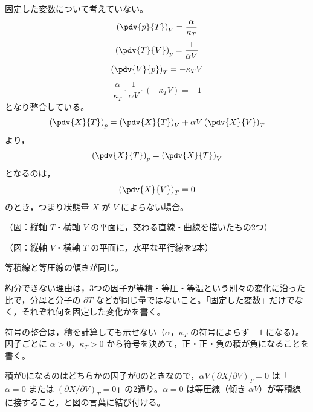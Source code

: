 固定した変数について考えていない。
\[ \left(\pdv{p}{T}\right)_{V}=\frac{\alpha}{\kappa_{T}} \]
\[ \left(\pdv{T}{V}\right)_{p}=\frac{1}{\alpha V} \]
\[ \left(\pdv{V}{p}\right)_{T}=-\kappa_{T}V \]
\[ \frac{\alpha}{\kappa_{T}}\cdot\frac{1}{\alpha V}\cdot(-\kappa_{T}V)=-1 \]
となり整合している。
\[ \left(\pdv{X}{T}\right)_{p}=\left(\pdv{X}{T}\right)_{V}+\alpha V\left(\pdv{X}{V}\right)_{T} \]
より，
\[ \left(\pdv{X}{T}\right)_{p}=\left(\pdv{X}{T}\right)_{V} \]
となるのは，
\[ \left(\pdv{X}{V}\right)_{T}=0 \]
のとき，つまり状態量 $X$ が $V$ によらない場合。

（図：縦軸 $T$・横軸 $V$ の平面に，交わる直線・曲線を描いたもの2つ）

（図：縦軸 $V$・横軸 $T$ の平面に，水平な平行線を2本）

等積線と等圧線の傾きが同じ。
\item 約分できない理由は，3つの因子が等積・等圧・等温という別々の変化に沿った比で，分母と分子の $\partial T$ などが同じ量ではないこと。「固定した変数」だけでなく，それぞれ何を固定した変化かを書く。
\item 符号の整合は，積を計算しても示せない（$\alpha$，$\kappa_{T}$ の符号によらず $-1$ になる）。因子ごとに $\alpha>0$，$\kappa_{T}>0$ から符号を決めて，正・正・負の積が負になることを書く。
\item 積が0になるのはどちらかの因子が0のときなので，$\alpha V(\partial X/\partial V)_{T}=0$ は「$\alpha=0$ または $(\partial X/\partial V)_{T}=0$」の2通り。$\alpha=0$ は等圧線（傾き $\alpha V$）が等積線に接すること，と図の言葉に結び付ける。
